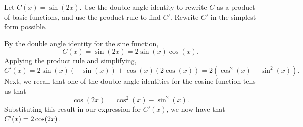 \begin{example} \label{Ex:2.6.Eg2}
Let $C(x) = \sin(2x).$  Use the double angle identity to rewrite $C$ as a product of basic functions, and use the product rule to find $C'$.  Rewrite $C'$ in the simplest form possible.  

\solution By the double angle identity for the sine function,
$$C(x) = \sin(2x) = 2\sin(x)\cos(x).$$
Applying the product rule and simplifying,
$$C'(x) = 2\sin(x)(-\sin(x)) + \cos(x)(2\cos(x)) = 2(\cos^2(x) - \sin^2(x)).$$
Next, we recall that one of the double angle identities for the cosine function tells us that 
$$\cos(2x) = \cos^2(x) - \sin^2(x).$$
Substituting this result in our expression for $C'(x)$, we now have that $\displaystyle C'(x) = 2 \cos(2x)$.
\end{example}